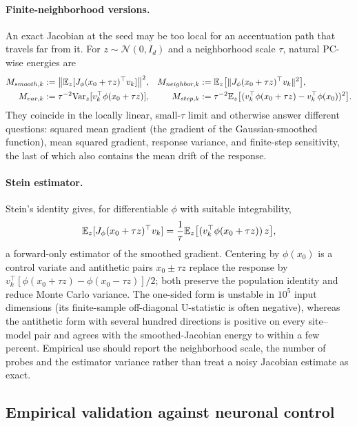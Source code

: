 {\paragraph{Finite-neighborhood versions.}
An exact Jacobian at the seed may be too local for an accentuation path
that travels far from it.  For $z\sim\mathcal N(0,I_d)$ and a neighborhood
scale $\tau$, natural PC-wise energies are
\begin{align}
M_{smooth,k}&:=\big\|\mathbb{E}_z[J_\phi(x_0+\tau z)^\top v_k]\big\|^2,&
M_{neighbor,k}&:=\mathbb{E}_z\big[\|J_\phi(x_0+\tau z)^\top v_k\|^2\big],\notag\\
M_{var,k}&:=\tau^{-2}\mathrm{Var}_z[v_k^\top\phi(x_0+\tau z)],&
M_{step,k}&:=\tau^{-2}\mathbb{E}_z\big[(v_k^\top\phi(x_0+\tau z)-v_k^\top\phi(x_0))^2\big].
\label{eq:nonlinear-neighborhood-estimators}
\end{align}
They coincide in the locally linear, small-$\tau$ limit and otherwise
answer different questions: squared mean gradient (the gradient of the
Gaussian-smoothed function), mean squared gradient, response variance, and
finite-step sensitivity, the last of which also contains the mean drift of
the response.

\paragraph{Stein estimator.}
Stein's identity gives, for differentiable $\phi$ with suitable
integrability,
\begin{equation}
\mathbb{E}_z[J_\phi(x_0+\tau z)^\top v_k]=\frac1\tau\mathbb{E}_z\big[(v_k^\top\phi(x_0+\tau z))\,z\big],
\label{eq:nonlinear-stein-estimator}
\end{equation}
a forward-only estimator of the smoothed gradient.  Centering by $\phi(x_0)$
is a control variate and antithetic pairs $x_0\pm\tau z$ replace the response
by $v_k^\top[\phi(x_0+\tau z)-\phi(x_0-\tau z)]/2$; both preserve the
population identity and reduce Monte Carlo variance.  The one-sided form is
unstable in $10^5$ input dimensions (its finite-sample off-diagonal
U-statistic is often negative), whereas the antithetic form with several
hundred directions is positive on every site--model pair and agrees with the
smoothed-Jacobian energy to within a few percent.  Empirical use should
report the neighborhood scale, the number of probes and the estimator
variance rather than treat a noisy Jacobian estimate as exact.

\subsection{Empirical validation against neuronal control}
\label{sec:app-nonlinear-biological-validation}

}
